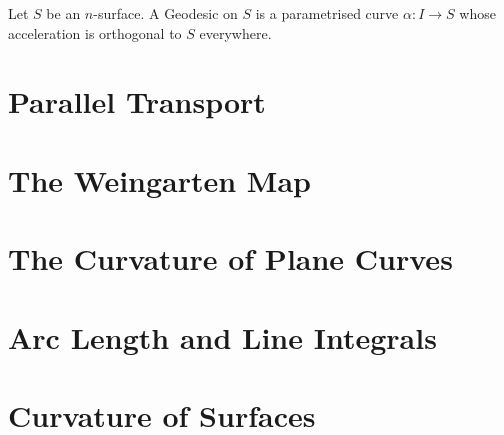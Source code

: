 \begin{definition}[geodesic]
	Let $S$ be an $n$-surface. A Geodesic on $S$ is a parametrised curve $\alpha : I \to S$ whose acceleration is orthogonal to $S$ everywhere.
\end{definition}

\section{Parallel Transport}

\section{The Weingarten Map}

\section{The Curvature of Plane Curves}

\section{Arc Length and Line Integrals}

\section{Curvature of Surfaces}

\setcounter{section}{13}
